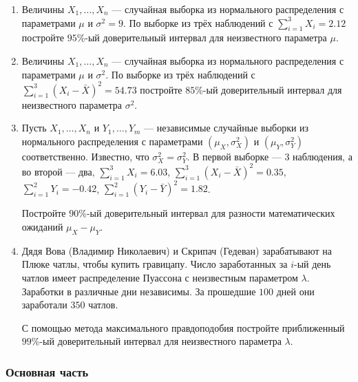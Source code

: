 \begin{enumerate}

	
	\item Величины $X_1, \ldots, X_n$ — случайная выборка из нормального распределения с параметрами $\mu$ и $\sigma^2 = 9$. 
	По выборке из трёх наблюдений с $\sum_{i=1}^3 X_i = 2.12$
	постройте $95$\%-ый доверительный интервал для неизвестного параметра $\mu$.
		
	\item Величины $X_1, \ldots, X_n$ — случайная выборка из нормального распределения с параметрами $\mu$ и $\sigma^2$. 
 	По выборке из трёх наблюдений с $\sum_{i=1}^3 (X_i - \bar X )^2 = 54.73$
	постройте $85$\%-ый доверительный интервал для неизвестного параметра $\sigma^2$.
	
	\item Пусть $X_1, \dots, X_n$ и $Y_1, \dots, Y_m$ — независимые случайные выборки из нормального распределения с параметрами $(\mu_X, \sigma_X^2)$ и $(\mu_Y, \sigma_Y^2)$ соответственно. 
	Известно, что $\sigma_X^2 = \sigma_Y^2$. В первой выборке — 3 наблюдения, а во второй — два, $\sum_{i=1}^3 X_i = 6.03$, 
	$\sum_{i=1}^3 (X_i - \bar X )^2 = 0.35$, $\sum_{i=1}^2 Y_i = -0.42$, 
	$\sum_{i=1}^2 (Y_i - \bar Y )^2 = 1.82$.
	
	Постройте $90$\%-ый доверительный интервал для разности математических ожиданий $\mu_X - \mu_Y$.
		
	\item Дядя Вова (Владимир Николаевич) и Скрипач (Гедеван) зарабатывают на Плюке чатлы, чтобы купить гравицапу. 
	Число заработанных за $i$-ый день чатлов имеет распределение Пуассона с неизвестным параметром $\lambda$. 
	Заработки в различные дни независимы. 
	За прошедшие $100$ дней они заработали $350$ чатлов.
	
	С помощью метода максимального правдоподобия постройте приближенный $99$\%-ый доверительный интервал для неизвестного параметра $\lambda$.
	
	\end{enumerate}
	

\subsubsection*{Основная часть}


